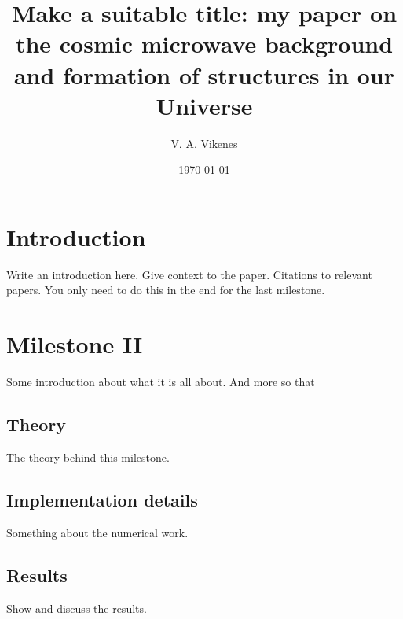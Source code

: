 

 

   \title{Make a suitable title: my paper on the cosmic microwave background and formation of structures in our Universe}

   \author{V. A. Vikenes}


   \date{\today}



   \maketitle

\section{Introduction}
Write an introduction here. Give context to the paper. Citations to relevant papers. You only need to do this in the end for the last milestone.





\section{Milestone II} 
Some introduction about what it is all about. And more so that 

\subsection{Theory}
The theory behind this milestone.

\subsection{Implementation details}
Something about the numerical work.

\subsection{Results}
Show and discuss the results.

